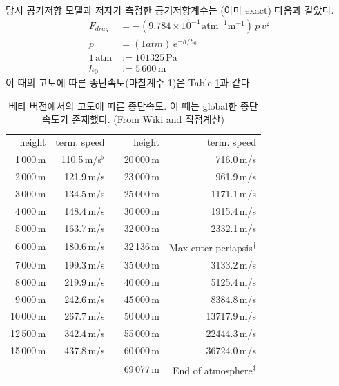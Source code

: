 \documentclass[9pt]{amsbook}
\newcommand{\ttuna}{\textsuperscript{$\dagger$}} %
\newcommand{\ttsecu}{\textsuperscript{$\ddagger$}} %
\begin{document}
당시 공기저항 모델과 저자가 측정한 공기저항계수는 (아마 exact) 다음과 같았다.
\begin{align}
F_{drag}&=-(9.784\times 10^{-4}\, \mathrm{atm}^{-1}\mathrm{m}^{-1})\, p\, v^2
\\p&=(1 atm)\,e^{-h/h_0}
\\1\,\mathrm{atm} &:= 101325\,\mathrm{Pa}
\\h_0&:= 5\,600\,\mathrm{m}
\end{align}
이 때의 고도에 따른 종단속도(마찰계수 1)은 Table \ref{table:obslete}과 같다.
\begin{table}
\begin{center}
\begin{threeparttable}
	\caption{베타 버전에서의 고도에 따른 종단속도. 이 때는 global한 종단속도가 존재했다.
	 (From Wiki and 직접계산)}\label{table:obslete}
		\begin{tabular}{|r|r|r|r|r|}
			\cline{1-2}\cline{4-5}
			height& term. speed&&height& term. speed
			\\\cline{1-2}\cline{4-5}
			1\,000\,m&110.5\,m/s$^\flat$ && 20\,000\,m&716.0\,m/s
			\\\cline{1-2}\cline{4-5}
			2\,000\,m&121.9\,m/s && 23\,000\,{m}&961.9\,m/s
			\\\cline{1-2}\cline{4-5}
			3\,000\,m&134.5\,m/s && 25\,000\,{m}&1171.1\,m/s
			\\\cline{1-2}\cline{4-5}
			4\,000\,m&148.4\,m/s && 30\,000\,{m}&1915.4\,m/s
			\\\cline{1-2}\cline{4-5}
			5\,000\,m&163.7\,m/s && 32\,000\,{m}&2332.1\,m/s
			\\\cline{1-2}\cline{4-5}
			6\,000\,{m}&180.6\,m/s && 32\,136\,{m}&Max enter periapsis\ttuna
			\\\cline{1-2}\cline{4-5}
			7\,000\,{m}&199.3\,m/s && 35\,000\,{m}&3133.2\,m/s
			\\\cline{1-2}\cline{4-5}
			8\,000\,{m}&219.9\,m/s && 40\,000\,{m}&5125.4\,m/s
			\\\cline{1-2}\cline{4-5}
			9\,000\,{m}&242.6\,m/s && 45\,000\,{m}&8384.8\,m/s
			\\\cline{1-2}\cline{4-5}
			10\,000\,{m}&267.7\,m/s && 50\,000\,{m}&13717.9\,m/s
			\\\cline{1-2}\cline{4-5}
			12\,500\,{m}&342.4\,m/s && 55\,000\,{m}&22444.3\,m/s
			\\\cline{1-2}\cline{4-5}
			15\,000\,{m}&437.8\,m/s && 60\,000\,{m}&36724.0\,m/s
			\\\cline{1-2}\cline{4-5}
			\multicolumn{3}{r|}{}&69\,077\,{m}&End of atmosphere\ttsecu

\end{tabular}
\end{threeparttable}
\end{center}
\end{table}
\end{document}
